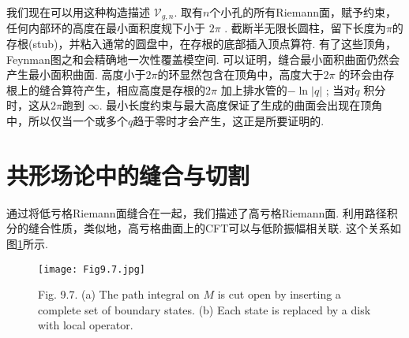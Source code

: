 我们现在可以用这种构造描述 $\mathscr{V}_{g, n}$. 取有$n$个小孔的所有Riemann面，赋予约束，任何内部环的高度在最小面积度规下小于 $2 \pi $ . 截断半无限长圆柱，留下长度为$\pi$的存根(stub)，并粘入通常的圆盘中，在存根的底部插入顶点算符. 有了这些顶角，Feynman图之和会精确地一次性覆盖模空间. 可以证明，缝合最小面积曲面仍然会产生最小面积曲面. 高度小于$2 \pi$的环显然包含在顶角中，高度大于$2 \pi$ 的环会由存根上的缝合算符产生，相应高度是存根的$2 \pi$ 加上排水管的$-\ln |q|$ ; 当对$q$ 积分时，这从$2 \pi$跑到 $\infty$. 最小长度约束与最大高度保证了生成的曲面会出现在顶角中，所以仅当一个或多个$q$趋于零时才会产生，这正是所要证明的.

\section{共形场论中的缝合与切割}%
通过将低亏格Riemann面缝合在一起，我们描述了高亏格Riemann面. 利用路径积分的缝合性质，类似地，高亏格曲面上的CFT可以与低阶振幅相关联. 这个关系如图\ref{Fig9.7}所示.

\begin{figure}
	\begin{center}
		\texttt{[image: Fig9.7.jpg]}\\
		\caption{Fig. 9.7. (a) The path integral on $M$ is cut open by inserting a complete set of boundary states. (b) Each state is replaced by a disk with local operator.}\label{Fig9.7}
	\end{center}
\end{figure}

